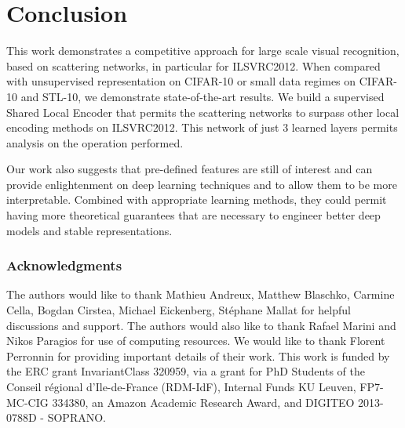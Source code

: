 \documentclass[10pt,twocolumn,letterpaper]{article}
\begin{document}
 
\section{Conclusion}
This work demonstrates a competitive approach for large scale visual recognition, based on scattering networks, in particular for  ILSVRC2012. When compared with unsupervised representation on CIFAR-10 or small data regimes on CIFAR-10 and STL-10, we demonstrate state-of-the-art results. We build a supervised Shared Local Encoder that permits the scattering networks to surpass other local encoding methods on ILSVRC2012. This network of just 3 learned layers permits analysis on the operation performed.

Our work also suggests that pre-defined features are still of interest and can provide enlightenment on deep learning techniques and to allow them to be more interpretable. Combined with appropriate learning methods, they could permit having more theoretical guarantees that are necessary to engineer better deep models and stable representations.



\subsubsection*{Acknowledgments}
The authors would like to thank  Mathieu Andreux, Matthew Blaschko, Carmine Cella, Bogdan Cirstea, Michael Eickenberg, St\'ephane Mallat for helpful discussions and support. The authors would also like to thank Rafael Marini and Nikos Paragios for use of computing resources. We would like to thank Florent Perronnin for providing important details of their work. This   work   is   funded   by   the   ERC   grant   InvariantClass   320959,   via   a   grant   for   PhD   Students of the Conseil r\'egional d'Ile-de-France (RDM-IdF), Internal Funds KU Leuven, FP7-MC-CIG 334380, an Amazon Academic Research Award, and DIGITEO 2013-0788D - SOPRANO.  
{\small


}
\end{document}

